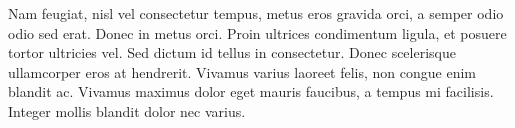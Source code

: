 

Nam feugiat, nisl vel consectetur tempus, metus eros gravida orci, a semper odio odio sed erat. Donec in metus orci. Proin ultrices condimentum ligula, et posuere tortor ultricies vel. Sed dictum id tellus in consectetur. Donec scelerisque ullamcorper eros at hendrerit. Vivamus varius laoreet felis, non congue enim blandit ac. Vivamus maximus dolor eget mauris faucibus, a tempus mi facilisis. Integer mollis blandit dolor nec varius.